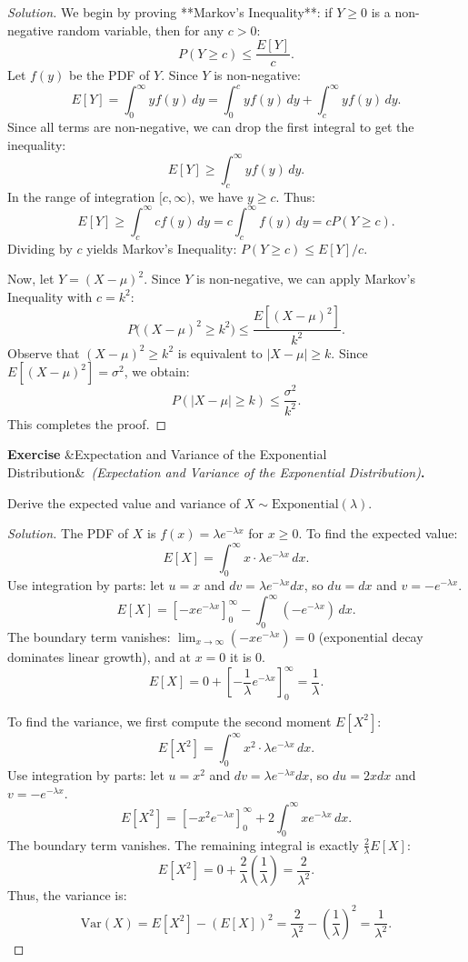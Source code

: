 \documentclass[12pt, a4paper]{article}
\newcounter{exercise}
\newenvironment{exercise}[1][]{%
  \refstepcounter{exercise}%
  \par\vspace{6pt}%
  \noindent\textbf{\color{Gold}Exercise \theexercise}%
  \ifx&#1&\else\ \textit{(#1)}\fi\textbf{.}\enskip
}{\par\vspace{4pt}}
\begin{document}
\begin{proof}[Solution]
We begin by proving **Markov's Inequality**: if $Y \ge 0$ is a non-negative random variable, then for any $c > 0$:
\[
  P(Y \ge c) \le \frac{E[Y]}{c}.
\]
Let $f(y)$ be the PDF of $Y$. Since $Y$ is non-negative:
\[
  E[Y] = \int_0^\infty y f(y) \, dy = \int_0^c y f(y) \, dy + \int_c^\infty y f(y) \, dy.
\]
Since all terms are non-negative, we can drop the first integral to get the inequality:
\[
  E[Y] \ge \int_c^\infty y f(y) \, dy.
\]
In the range of integration $[c, \infty)$, we have $y \ge c$. Thus:
\[
  E[Y] \ge \int_c^\infty c f(y) \, dy = c \int_c^\infty f(y) \, dy = c P(Y \ge c).
\]
Dividing by $c$ yields Markov's Inequality: $P(Y \ge c) \le E[Y]/c$.

Now, let $Y = (X - \mu)^2$. Since $Y$ is non-negative, we can apply Markov's Inequality with $c = k^2$:
\[
  P\bigl((X - \mu)^2 \ge k^2\bigr) \le \frac{E[(X - \mu)^2]}{k^2}.
\]
Observe that $(X - \mu)^2 \ge k^2$ is equivalent to $|X - \mu| \ge k$. Since $E[(X - \mu)^2] = \sigma^2$, we obtain:
\[
  P(|X - \mu| \ge k) \le \frac{\sigma^2}{k^2}.
\]
This completes the proof.
\end{proof}

\begin{exercise}[Expectation and Variance of the Exponential Distribution]
Derive the expected value and variance of $X \sim \text{Exponential}(\lambda)$.
\end{exercise}

\begin{proof}[Solution]
The PDF of $X$ is $f(x) = \lambda e^{-\lambda x}$ for $x \ge 0$.
To find the expected value:
\[
  E[X] = \int_0^\infty x \cdot \lambda e^{-\lambda x} \, dx.
\]
Use integration by parts: let $u = x$ and $dv = \lambda e^{-\lambda x} dx$, so $du = dx$ and $v = -e^{-\lambda x}$.
\[
  E[X] = \left[ -x e^{-\lambda x} \right]_0^\infty - \int_0^\infty (-e^{-\lambda x}) \, dx.
\]
The boundary term vanishes: $\lim_{x\to\infty} (-x e^{-\lambda x}) = 0$ (exponential decay dominates linear growth), and at $x=0$ it is 0.
\[
  E[X] = 0 + \left[ -\frac{1}{\lambda} e^{-\lambda x} \right]_0^\infty = \frac{1}{\lambda}.
\]

To find the variance, we first compute the second moment $E[X^2]$:
\[
  E[X^2] = \int_0^\infty x^2 \cdot \lambda e^{-\lambda x} \, dx.
\]
Use integration by parts: let $u = x^2$ and $dv = \lambda e^{-\lambda x} dx$, so $du = 2x dx$ and $v = -e^{-\lambda x}$.
\[
  E[X^2] = \left[ -x^2 e^{-\lambda x} \right]_0^\infty + 2 \int_0^\infty x e^{-\lambda x} \, dx.
\]
The boundary term vanishes. The remaining integral is exactly $\frac{2}{\lambda} E[X]$:
\[
  E[X^2] = 0 + \frac{2}{\lambda} \left( \frac{1}{\lambda} \right) = \frac{2}{\lambda^2}.
\]
Thus, the variance is:
\[
  \text{Var}(X) = E[X^2] - (E[X])^2 = \frac{2}{\lambda^2} - \left( \frac{1}{\lambda} \right)^2 = \frac{1}{\lambda^2}.
\]
\end{proof}
\end{document}
